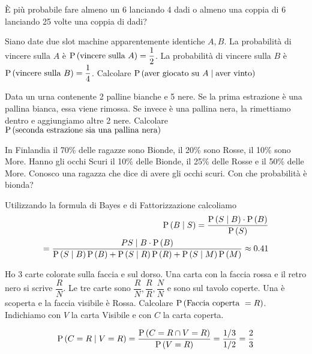 
\begin{exrc}
	È più probabile fare almeno un 6 lanciando 4 dadi o almeno una coppia di 6 lanciando 25 volte una coppia di dadi?
\end{exrc}

\begin{exrc}
	Siano date due slot machine apparentemente identiche $ A,B $. La probabilità di vincere sulla $ A $ è $ \text{P}\left(\text{vincere sulla }A\right) = \dfrac{1}{2}$. La probabilità di vincere sulla $ B $ è $ \text{P}\left(\text{vincere sulla }B\right) = \dfrac{1}{4}$. Calcolare $ \text{P}\left(\text{aver giocato su }A \mid \text{aver vinto}\right) $
\end{exrc}

\begin{exrc}
	Data un urna contenente 2 palline bianche e 5 nere. Se la prima estrazione è una pallina bianca, essa viene rimossa. Se invece è una pallina nera, la rimettiamo dentro e aggiungiamo altre 2 nere. Calcolare $ \text{P}\left(\text{seconda estrazione sia una pallina nera}\right) $
\end{exrc}

\begin{exrc}
	In Finlandia il 70\% delle ragazze sono Bionde, il 20\% sono Rosse, il 10\% sono More. Hanno gli occhi Scuri il 10\% delle Bionde, il 25\% delle Rosse e il 50\% delle More.
	Conosco una ragazza che dice di avere gli occhi scuri. Con che probabilità è bionda?
	
	Utilizzando la formula di Bayes e di Fattorizzazione calcoliamo
	\begin{equation*}
	\begin{aligned}
	\text{P}\left(B \mid S\right) = \dfrac{\text{P}\left(S \mid B\right) \cdot \text{P}\left(B\right)}{\text{P}\left(S\right)} \\
	= \dfrac{P{S \mid B} \cdot \text{P}\left(B\right)}{\text{P}\left(S \mid B\right) \text{P}\left(B\right) + \text{P}\left(S \mid R\right) \text{P}\left(R\right) + \text{P}\left(S \mid M\right) \text{P}\left(M\right)} \approx 0.41
	\end{aligned}
	\end{equation*}
\end{exrc}

\begin{exrc}
	Ho 3 carte colorate sulla faccia e sul dorso. Una carta con la faccia rossa e il retro nero si scrive $ \dfrac{R}{N} $. Le tre carte sono $ \dfrac{R}{N}, \dfrac{R}{R}, \dfrac{N}{N} $ e sono sul tavolo coperte. Una è scoperta e la faccia visibile è Rossa. Calcolare $ \text{P}\left(\text{Faccia coperta } = R\right) $. Indichiamo con $ V $ la carta Visibile e con $ C $ la carta coperta.
	
	\begin{equation*}
	\begin{aligned}
	\text{P}\left(C = R \mid V = R\right) = \dfrac{\text{P}\left(C = R \cap V = R\right)}{\text{P}\left(V = R\right)} = \dfrac{1/3}{1/2} = \dfrac{2}{3}
	\end{aligned} 
	\end{equation*}
\end{exrc}



